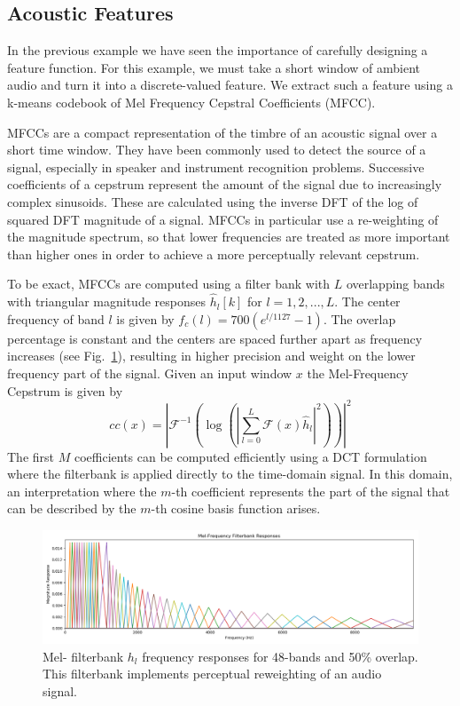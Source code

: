 \subsection{Acoustic Features}
In the previous example we have seen the importance of carefully designing a feature function. For this example, we must take a short window of ambient audio and turn it into a discrete-valued feature. We extract such a feature using a k-means codebook of Mel Frequency Cepstral Coefficients (MFCC).

MFCCs are a compact representation of the timbre of an acoustic signal over a short time window. They have been commonly used to detect the source of a signal, especially in speaker and instrument recognition problems. Successive coefficients of a cepstrum represent the amount of the signal due to increasingly complex sinusoids. These are calculated using the inverse DFT of the log of squared DFT magnitude of a signal. MFCCs in particular use a re-weighting of the magnitude spectrum, so that lower frequencies are treated as more important than higher ones in order to achieve a more perceptually relevant cepstrum.

To be exact, MFCCs are computed using a filter bank with $L$ overlapping bands with triangular magnitude responses $\hat{h}_{l}[k]$ for $l=1, 2, ..., L$. The center frequency of band $l$ is given by $f_c(l) = 700 (e^{l/1127} - 1)$. The overlap percentage is constant and the centers are spaced further apart as frequency increases (see Fig.~\ref{fig:audio-melbank}), resulting in higher precision and weight on the lower frequency part of the signal. Given an input window $x$ the Mel-Frequency Cepstrum is given by
\begin{equation}
    cc(x) = \left| \mathcal{F}^{-1} \left( \log\left( \left|
    \sum_{l=0}^L
    \mathcal{F} \left(x\right) \hat{h}_l
    \right|^2 \right) \right) \right|^2
\end{equation}
The first $M$ coefficients can be computed efficiently using a DCT formulation where the filterbank is applied directly to the time-domain signal. In this domain, an interpretation where the $m$-th coefficient represents the part of the signal that can be described by the $m$-th cosine basis function arises.

\begin{figure}
    \centering
    \includegraphics[width=\textwidth]{figures/audio/mel-responses.png}
    \caption{Mel- filterbank $h_l$ frequency responses for 48-bands and 50\% overlap. This filterbank implements perceptual reweighting of an audio signal.}
    \label{fig:audio-melbank}
\end{figure}

